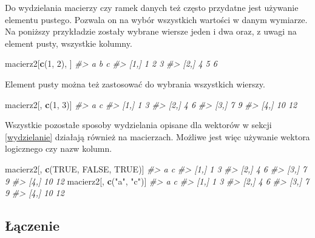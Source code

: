 \documentclass[paper=6in:9in,pagesize=pdftex,headinclude=on,footinclude=on,10pt]{scrbook}
\newenvironment{Shaded}{\begin{snugshade}}{\end{snugshade}}
\newcommand{\CommentTok}[1]{\textcolor[rgb]{0.56,0.35,0.01}{\textit{#1}}}
\newcommand{\DecValTok}[1]{\textcolor[rgb]{0.00,0.00,0.81}{#1}}
\newcommand{\KeywordTok}[1]{\textcolor[rgb]{0.13,0.29,0.53}{\textbf{#1}}}
\newcommand{\NormalTok}[1]{#1}
\newcommand{\OtherTok}[1]{\textcolor[rgb]{0.56,0.35,0.01}{#1}}
\newcommand{\StringTok}[1]{\textcolor[rgb]{0.31,0.60,0.02}{#1}}
\begin{document}
Do wydzielania macierzy czy ramek danych też często przydatne jest używanie elementu pustego.
Pozwala on na wybór wszystkich wartości w danym wymiarze.
Na poniższy przykładzie zostały wybrane wiersze jeden i dwa oraz, z uwagi na element pusty, wszystkie kolumny.

\begin{Shaded}
\begin{Highlighting}[]
\NormalTok{macierz2[}\KeywordTok{c}\NormalTok{(}\DecValTok{1}\NormalTok{, }\DecValTok{2}\NormalTok{), ]}
\CommentTok{#>      a b c}
\CommentTok{#> [1,] 1 2 3}
\CommentTok{#> [2,] 4 5 6}
\end{Highlighting}
\end{Shaded}

Element pusty można też zastosować do wybrania wszystkich wierszy.

\begin{Shaded}
\begin{Highlighting}[]
\NormalTok{macierz2[, }\KeywordTok{c}\NormalTok{(}\DecValTok{1}\NormalTok{, }\DecValTok{3}\NormalTok{)]}
\CommentTok{#>       a  c}
\CommentTok{#> [1,]  1  3}
\CommentTok{#> [2,]  4  6}
\CommentTok{#> [3,]  7  9}
\CommentTok{#> [4,] 10 12}
\end{Highlighting}
\end{Shaded}

Wszystkie pozostałe sposoby wydzielania opisane dla wektorów w sekcji \ref{wydzielanie} działają również na macierzach.
Możliwe jest więc używanie wektora logicznego czy nazw kolumn.

\begin{Shaded}
\begin{Highlighting}[]
\NormalTok{macierz2[, }\KeywordTok{c}\NormalTok{(}\OtherTok{TRUE}\NormalTok{, }\OtherTok{FALSE}\NormalTok{, }\OtherTok{TRUE}\NormalTok{)]}
\CommentTok{#>       a  c}
\CommentTok{#> [1,]  1  3}
\CommentTok{#> [2,]  4  6}
\CommentTok{#> [3,]  7  9}
\CommentTok{#> [4,] 10 12}
\NormalTok{macierz2[, }\KeywordTok{c}\NormalTok{(}\StringTok{"a"}\NormalTok{, }\StringTok{"c"}\NormalTok{)]}
\CommentTok{#>       a  c}
\CommentTok{#> [1,]  1  3}
\CommentTok{#> [2,]  4  6}
\CommentTok{#> [3,]  7  9}
\CommentTok{#> [4,] 10 12}
\end{Highlighting}
\end{Shaded}

\hypertarget{ux142ux105czenie}{%
\subsection{Łączenie}\label{ux142ux105czenie}}
\end{document}
